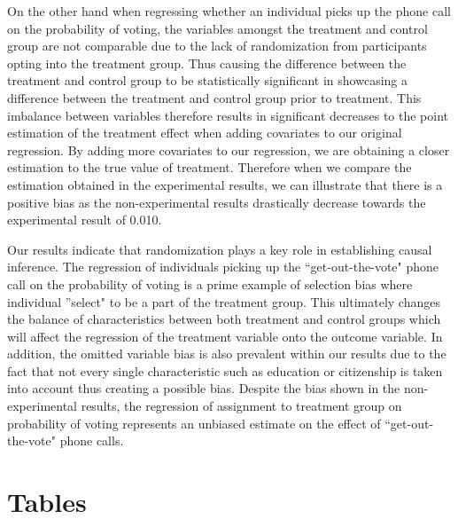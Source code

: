 \documentclass[12pt]{article}
\begin{document}
\indent On the other hand when regressing whether an individual picks up the phone call on the probability of voting, the variables amongst the treatment and control group are not comparable due to the lack of randomization from participants opting into the treatment group. Thus causing the difference between the treatment and control group to be statistically significant in showcasing a difference between the treatment and control group prior to treatment. This imbalance between variables therefore results in significant decreases to the point estimation of the treatment effect when adding covariates to our original regression. By adding more covariates to our regression, we are obtaining a closer estimation to the true value of treatment. Therefore when we compare the estimation obtained in the experimental results, we can illustrate that there is a positive bias as the non-experimental results drastically decrease towards the experimental result of 0.010.

\indent Our results indicate that randomization plays a key role in establishing causal inference. The regression of individuals picking up the ``get-out-the-vote" phone call on the probability of voting is a prime example of selection bias where individual ''select" to be a part of the treatment group. This ultimately changes the balance of characteristics between both treatment and control groups which will affect the regression of the treatment variable onto the outcome variable. In addition, the omitted variable bias is also prevalent within our results due to the fact that not every single characteristic such as education or citizenship is taken into account thus creating a possible bias. Despite the bias shown in the non-experimental results, the regression of assignment to treatment group on probability of voting represents an unbiased estimate on the effect of ``get-out-the-vote" phone calls.

\pagebreak
\section{Tables}
\end{document}

